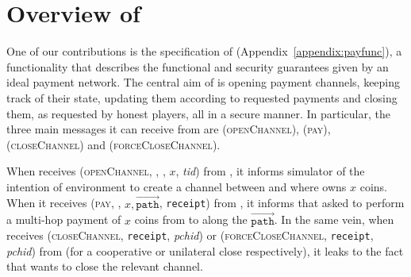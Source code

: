 \section{Overview of \fpaynet{}}
\label{sec:ov-paynet}
  One of our contributions is the specification of \fpaynet{}
  (Appendix~\ref{appendix:payfunc}), a functionality that describes the
  functional and security guarantees given by an ideal payment network. The
  central aim of \fpaynet{} is opening payment channels, keeping
  track of their state, updating them according to requested payments and
  closing them, as requested by honest players, all in a secure manner. In
  particular, the three main messages it can receive from \alice{} are
  (\textsc{openChannel}), (\textsc{pay}), (\textsc{closeChannel}) and
  (\textsc{forceCloseChannel}).

  When \fpaynet{} receives (\textsc{openChannel}, \alice, \bob, $x$,
  \textit{tid}) from \alice, it informs simulator \simulator{} of the intention
  of environment \environment{} to create a channel between \alice{} and \bob{}
  where \alice{} owns $x$ coins. When it receives (\textsc{pay}, \bob, $x,
  \overrightarrow{\mathtt{path}}$, \texttt{receipt}) from \alice, it informs
  \simulator{} that \environment{} asked to perform a multi-hop payment of $x$
  coins from \alice{} to \bob{} along the $\overrightarrow{\mathtt{path}}$. In
  the same vein, when \fpaynet{} receives (\textsc{closeChannel},
  \texttt{receipt}, \textit{pchid}) or (\textsc{forceCloseChannel},
  \texttt{receipt}, \textit{pchid}) from \alice{} (for a cooperative or
  unilateral close respectively), it leaks to \simulator{} the fact that
  \environment{} wants to close the relevant channel.

